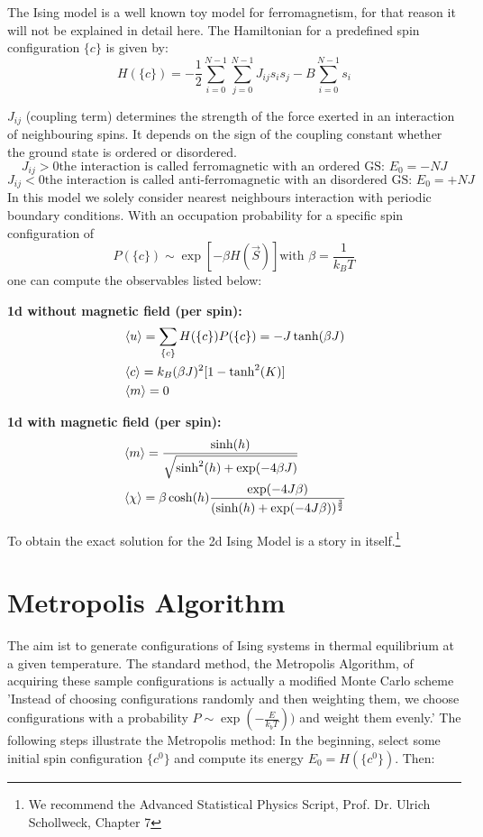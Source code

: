\documentclass[12pt,a4paper,titlepage]{article}
\begin{document}
The Ising model is a well known toy model for ferromagnetism, for that reason it will not be explained in detail here.
The Hamiltonian for a predefined spin configuration $\{c\}$ is given by:
 \[H(\{c\})= - \frac{1}{2}\sum_{i=0}^{N-1} \sum_{j=0}^{N-1} J_{ij} s_i s_j - B \sum_{i=0}^{N-1}s_i\]

$J_{ij}$ (coupling term) determines the strength of the force exerted in an interaction of neighbouring spins. It depends on the sign of the coupling constant whether the ground state is ordered or disordered. 
\[J_{ij} > 0 \text{the interaction is called ferromagnetic with an ordered GS: } E_0=-NJ\]
\[J_{ij} < 0 \text{the interaction is called anti-ferromagnetic with an disordered GS: } E_0=+NJ\]
In this model we solely consider nearest neighbours interaction with periodic boundary conditions.
With an occupation probability for a specific spin configuration of
\[P(\{c\}) \sim \exp[-\beta H(\vec{S})] \text{with } \beta = \frac{1}{k_B T}\]
one can compute the observables listed below:\newline

\textbf{1d without magnetic field (per spin):}
\begin{align*}
&\braket{u} = \sum_{\{c\}}H(\{c\})P(\{c\}) = -J \tanh(\beta J)\\
&\braket{c} = k_B(\beta J)^2[1-\tanh^2(K)]\\
&\braket{m} = 0 
\end{align*} 


\textbf{1d with magnetic field (per spin):}
\begin{align*}
&\braket{m} = \frac{\sinh(h)}{\sqrt{\sinh^2(h) + \exp(-4\beta J) }}\\
&\braket{\chi}=\beta \cosh(h) \frac{\exp(-4J\beta)}{(\sinh(h)+\exp(-4J\beta))^{\frac{3}{2}}}
\end{align*}


To obtain the exact solution for the 2d Ising Model is a story in itself.\footnote[1]{We recommend the Advanced Statistical Physics Script,
\newline Prof. Dr. Ulrich Schollweck, Chapter 7}







\section{Metropolis Algorithm}

The aim ist to generate configurations of Ising systems in thermal equilibrium at a given temperature. The standard method, the Metropolis Algorithm, of acquiring these sample configurations is actually a modified Monte Carlo scheme 'Instead of choosing configurations randomly and then weighting them, we choose configurations with a probability $P\sim \exp(-\frac{E}{k_b T}))$ and weight them evenly.'\cite{metropolis}\newline
The following steps illustrate the Metropolis method:\newline
In the beginning, select some initial spin configuration $\{c^0\}$ and compute its energy $E_0 = H(\{c^0\})$.
Then:
\end{document}
